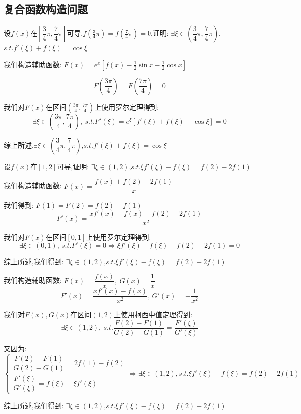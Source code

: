 \subsection{复合函数构造问题}
\begin{proposition}
	设$f(x)$在$[\dfrac{3}{4}\pi,\dfrac{7}{4}\pi]$可导,$f(\frac{3}{4}\pi)=f(\frac{7}{4}\pi)=0$,证明: $\exists \xi\in(\dfrac{3}{4}\pi,\dfrac{7}{4}\pi)$,$s.t. f'(\xi)+f(\xi)=\cos \xi$
\end{proposition}
\begin{solution}

	我们构造辅助函数: $F(x)=e^x[f(x)-\frac{1}{2}\sin x-\frac{1}{2}\cos x]$

	$$F(\frac{3\pi}{4})=F(\frac{7\pi}{4})=0$$

	我们对$F(x)$在区间$(\frac{3\pi}{4},\frac{7\pi}{4})$上使用罗尔定理得到:
	$$\exists \xi\in(\frac{3\pi}{4},\frac{7\pi}{4}),\ s.t. F'(\xi)=e^{\xi}[f'(\xi)+f(\xi)-\cos \xi]=0$$

	综上所述,$\exists \xi\in(\dfrac{3}{4}\pi,\dfrac{7}{4}\pi)$,$s.t. f'(\xi)+f(\xi)=\cos \xi$
\end{solution}


\begin{proposition}
	设$f(x)$在$[1,2]$可导,证明: $\exists \xi\in(1,2)$,$s.t. \xi f'(\xi)-f(\xi)=f(2)-2f(1)$
\end{proposition}
\begin{solution}

	我们构造辅助函数: $F(x)=\dfrac{f(x)+f(2)-2f(1)}{x}$

	我们得到: $F(1)=F(2)=f(2)-f(1)$
	$$F'(x)=\dfrac{xf'(x)-f(x)-f(2)+2f(1)}{x^2}$$

	我们对$F(x)$在区间$[0,1]$上使用罗尔定理得到:
	$$\exists\xi\in(0,1),\ s.t. F'(\xi)=0\Rightarrow \xi f'(\xi)-f(\xi)-f(2)+2f(1)=0$$

	综上所述,我们得到: $\exists \xi\in(1,2)$,$s.t. \xi f'(\xi)-f(\xi)=f(2)-2f(1)$
\end{solution}
\begin{anymark}[注: 柯西中值定理]
	我们构造辅助函数: $F(x)=\dfrac{f(x)}{x},\ G(x)=\dfrac{1}{x}$
	$$F'(x)=\dfrac{xf'(x)-f(x)}{x^2},\ G'(x)=-\dfrac{1}{x^2}$$

	我们对$F(x),G(x)$在区间$(1,2)$上使用柯西中值定理得到:
	$$\exists\xi\in(1,2),\ s.t.\dfrac{F(2)-F(1)}{G(2)-G(1)}=\dfrac{F'(\xi)}{G'(\xi)}$$

	又因为:
	$$\left\lbrace
		\begin{array}{l}
			\dfrac{F(2)-F(1)}{G(2)-G(1)}=2f(1)-f(2) \\
			\dfrac{F'(\xi)}{G'(\xi)}=f(\xi)-\xi f'(\xi)
		\end{array}
		\right. \Rightarrow \exists \xi\in(1,2),s.t. \xi f'(\xi)-f(\xi)=f(2)-2f(1)$$

	综上所述,我们得到: $\exists \xi\in(1,2)$,$s.t. \xi f'(\xi)-f(\xi)=f(2)-2f(1)$
\end{anymark}

